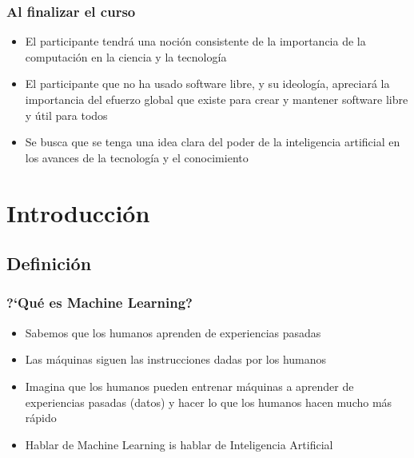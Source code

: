 \documentclass[10pt]{beamer}
\begin{document}
\begin{frame}
\frametitle{Al finalizar el curso}

\begin{beamerboxesrounded}[upper=uppercolor, lower=lowercolor, shadow=true]{} 

\begin{itemize}
\item El participante tendr\'a una noci\'on consistente de la importancia de la computaci\'on en la ciencia y la tecnolog\'ia 

\item El participante que no ha usado software libre, y su ideolog\'ia, apreciar\'a la importancia del efuerzo global que existe para crear y mantener software libre y \'util para todos

\item Se busca que se tenga una idea clara del poder de la inteligencia artificial en los avances de la tecnolog\'ia y el conocimiento

\end{itemize}
\end{beamerboxesrounded}

\end{frame}


\section{Introducci\'on}

\subsection{Definici\'on}
\begin{frame}
\frametitle{?`Qu\'e es Machine Learning?}

\begin{beamerboxesrounded}[upper=uppercolor, lower=lowercolor, shadow=true]{} 

\begin{itemize}
\item Sabemos que los humanos aprenden de experiencias pasadas
\item Las m\'aquinas siguen las instrucciones dadas por los humanos
\item Imagina que los humanos pueden entrenar m\'aquinas a aprender de experiencias pasadas (datos) y hacer lo que los humanos hacen mucho m\'as r\'apido
\item Hablar de Machine Learning is hablar de Inteligencia Artificial

\end{itemize}
\end{beamerboxesrounded}

\end{frame}
\end{document}

